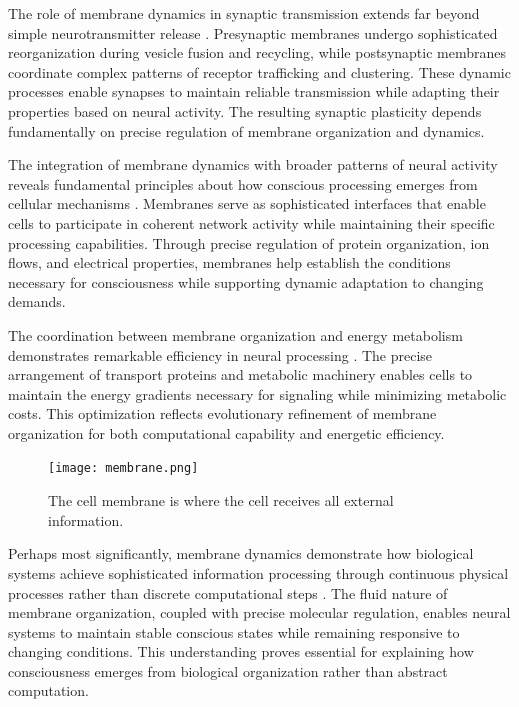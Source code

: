 \begin{refsection}
The role of membrane dynamics in synaptic transmission extends far beyond simple neurotransmitter release \cite{Sudhof2013}. Presynaptic membranes undergo sophisticated reorganization during vesicle fusion and recycling, while postsynaptic membranes coordinate complex patterns of receptor trafficking and clustering. These dynamic processes enable synapses to maintain reliable transmission while adapting their properties based on neural activity. The resulting synaptic plasticity depends fundamentally on precise regulation of membrane organization and dynamics.

The integration of membrane dynamics with broader patterns of neural activity reveals fundamental principles about how conscious processing emerges from cellular mechanisms \cite{Choquet2013}. Membranes serve as sophisticated interfaces that enable cells to participate in coherent network activity while maintaining their specific processing capabilities. Through precise regulation of protein organization, ion flows, and electrical properties, membranes help establish the conditions necessary for consciousness while supporting dynamic adaptation to changing demands.

The coordination between membrane organization and energy metabolism demonstrates remarkable efficiency in neural processing \cite{Goni2014}. The precise arrangement of transport proteins and metabolic machinery enables cells to maintain the energy gradients necessary for signaling while minimizing metabolic costs. This optimization reflects evolutionary refinement of membrane organization for both computational capability and energetic efficiency.

\begin{figure}[h]
    \centering
    \texttt{[image: membrane.png]}

    \caption{The cell membrane is where the cell receives all external information. }
\end{figure}

Perhaps most significantly, membrane dynamics demonstrate how biological systems achieve sophisticated information processing through continuous physical processes rather than discrete computational steps \cite{Sachs2010}. The fluid nature of membrane organization, coupled with precise molecular regulation, enables neural systems to maintain stable conscious states while remaining responsive to changing conditions. This understanding proves essential for explaining how consciousness emerges from biological organization rather than abstract computation.


\end{refsection}
